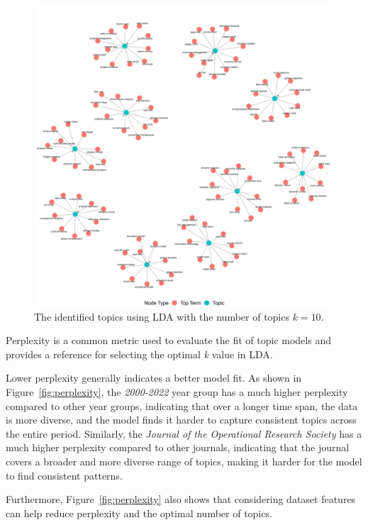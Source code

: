 \documentclass[9pt,twocolumn,twoside]{pnas-new}
\begin{document}
\begin{figure}[!tbhp]
\centering

\includegraphics[width=0.9\linewidth]{bag_words/Topics_LDAk6.png}


\caption{The identified topics using LDA with the number of topics $k = 10$.}
\label{fig:perplexityk6}
\end{figure}



Perplexity is a common metric used to evaluate the fit of topic models and provides a reference for selecting the optimal \textit{k} value in LDA. 

Lower perplexity generally indicates a better model fit. As shown in Figure~\ref{fig:perplexity}, the \textit{2000-2022} year group has a much higher perplexity compared to other year groups, indicating that over a longer time span, the data is more diverse, and the model finds it harder to capture consistent topics across the entire period. Similarly, the \textit{Journal of the Operational Research Society} has a much higher perplexity compared to other journals, indicating that the journal covers a broader and more diverse range of topics, making it harder for the model to find consistent patterns.

Furthermore, Figure~\ref{fig:perplexity} also shows that considering dataset features can help reduce perplexity and the optimal number of topics.
\end{document}
